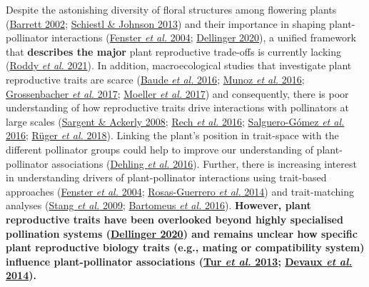 \documentclass[
  12pt,
  a4paper,
]{article}
\begin{document}
Despite the astonishing diversity of floral structures among flowering plants (\protect\hyperlink{ref-barrett2002}{Barrett 2002}; \protect\hyperlink{ref-schiestl2013}{Schiestl \& Johnson 2013}) and their importance in shaping plant-pollinator interactions (\protect\hyperlink{ref-fenster2004}{Fenster \emph{et al.} 2004}; \protect\hyperlink{ref-dellinger2020}{Dellinger 2020}), a unified framework that \textbf{describes the major} plant reproductive trade-offs is currently lacking (\protect\hyperlink{ref-roddy2021}{Roddy \emph{et al.} 2021}). In addition, macroecological studies that investigate plant reproductive traits are scarce (\protect\hyperlink{ref-baude2016}{Baude \emph{et al.} 2016}; \protect\hyperlink{ref-munoz2016}{Munoz \emph{et al.} 2016}; \protect\hyperlink{ref-grossenbacher2017}{Grossenbacher \emph{et al.} 2017}; \protect\hyperlink{ref-moeller2017}{Moeller \emph{et al.} 2017}) and consequently, there is poor understanding of how reproductive traits drive interactions with pollinators at large scales (\protect\hyperlink{ref-sargent2008}{Sargent \& Ackerly 2008}; \protect\hyperlink{ref-rech2016}{Rech \emph{et al.} 2016}; \protect\hyperlink{ref-salguero2016}{Salguero-Gómez \emph{et al.} 2016}; \protect\hyperlink{ref-ruger2018}{Rüger \emph{et al.} 2018}). Linking the plant's position in trait-space with the different pollinator groups could help to improve our understanding of plant-pollinator associations (\protect\hyperlink{ref-dehling2016}{Dehling \emph{et al.} 2016}). Further, there is increasing interest in understanding drivers of plant-pollinator interactions using trait-based approaches (\protect\hyperlink{ref-fenster2004}{Fenster \emph{et al.} 2004}; \protect\hyperlink{ref-rosas2014}{Rosas-Guerrero \emph{et al.} 2014}) and trait-matching analyses (\protect\hyperlink{ref-stang2009}{Stang \emph{et al.} 2009}; \protect\hyperlink{ref-bartomeus2016}{Bartomeus \emph{et al.} 2016}). \textbf{However, plant reproductive traits have been overlooked beyond highly specialised pollination systems (\protect\hyperlink{ref-dellinger2020}{Dellinger 2020}) and remains unclear how specific plant reproductive biology traits (e.g., mating or compatibility system) influence plant-pollinator associations (\protect\hyperlink{ref-tur2013}{Tur \emph{et al.} 2013}; \protect\hyperlink{ref-devaux2014}{Devaux \emph{et al.} 2014}).}
\end{document}
